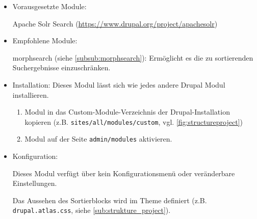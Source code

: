 \begin{itemize}[parsep=0pt, itemsep=5.0pt plus 2.0pt minus 1.0pt, leftmargin=*]
	\item Vorausgesetzte Module:
	
	Apache Solr Search (\url{https://www.drupal.org/project/apachesolr})
	
	
	\item Empfohlene Module:
	
	morphsearch (siehe \cref{subsub:morphsearch}): Ermöglicht es die zu sortierenden Suchergebnisse einzuschränken.
	
	
	\item Installation: Dieses Modul lässt sich wie jedes andere Drupal Modul installieren.
	\begin{enumerate}
		\item Modul in das Custom-Module-Verzeichnis der Drupal-Installation kopieren  (z.B. \lstinline|sites/all/modules/custom|, vgl. \cref{fig:structureproject})
		\item Modul auf der Seite \lstinline|admin/modules| aktivieren.
	\end{enumerate}
	
	\item Konfiguration:
	
	Dieses Modul verfügt über kein Konfigurationsmenü oder veränderbare Einstellungen.
	
	Das Aussehen des Sortierblocks wird im Theme definiert (z.B. \lstinline|drupal.atlas.css|, siehe \cref{sub:strukture_project}).
	
\end{itemize}


\newpage

